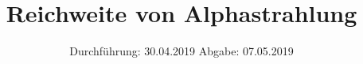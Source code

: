 

\subject{V701}
\title{Reichweite von Alphastrahlung}
\date{%
  Durchführung: 30.04.2019
  \hspace{3em}
  Abgabe: 07.05.2019
}



\maketitle
\thispagestyle{empty}
\tableofcontents
\newpage






\printbibliography{}


